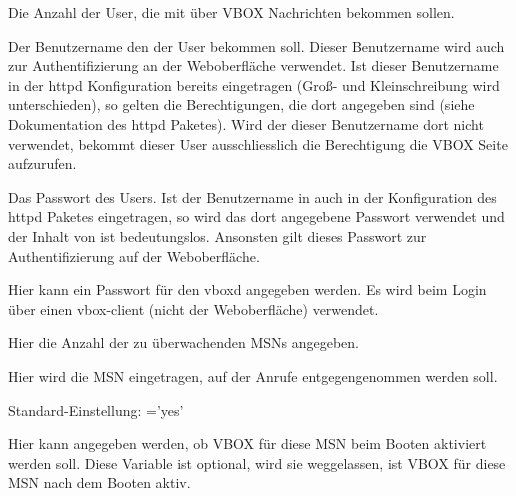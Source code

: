 \begin{description}


    Die Anzahl der User, die mit über VBOX Nachrichten bekommen sollen.


    Der Benutzername den der User bekommen soll. Dieser Benutzername wird auch zur
    Authentifizierung an der Weboberfläche verwendet. Ist dieser Benutzername in der httpd 
    Konfiguration bereits eingetragen (Groß- und Kleinschreibung wird unterschieden), so 
    gelten die Berechtigungen, die dort angegeben sind (siehe Dokumentation des httpd Paketes).
    Wird der dieser Benutzername dort nicht verwendet, bekommt dieser User ausschliesslich die
    Berechtigung die VBOX Seite aufzurufen.


    Das Passwort des Users. Ist der Benutzername in  auch
    in der Konfiguration des httpd Paketes eingetragen, so wird das dort angegebene
    Passwort verwendet und der Inhalt von  ist bedeutungslos.
    Ansonsten gilt dieses Passwort zur Authentifizierung auf der Weboberfläche.
    

    Hier kann ein Passwort für den vboxd angegeben werden. Es wird beim Login
    über einen vbox-client (nicht der Weboberfläche) verwendet.
    

    Hier die Anzahl der zu überwachenden MSNs angegeben. 


    Hier wird die MSN eingetragen, auf der Anrufe entgegengenommen werden soll.


    Standard-Einstellung: ='yes'

    Hier kann angegeben werden, ob VBOX für diese MSN beim Booten aktiviert 
    werden soll. Diese Variable ist optional, wird sie weggelassen, ist VBOX für 
    diese MSN nach dem Booten aktiv.


\end{description}
